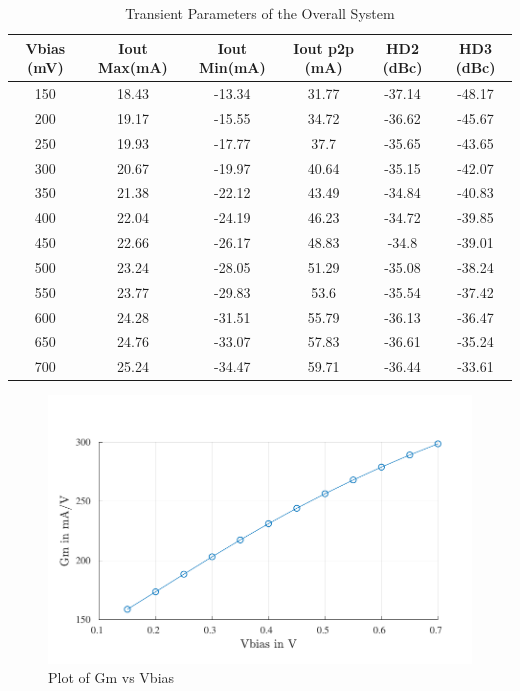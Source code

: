 \begin{table} [H]
\centering
\begin{tabular}{@{}cccccc@{}}
\toprule
Vbias (mV)		& Iout Max(mA)		& Iout Min(mA)	 & Iout p2p (mA) & HD2 (dBc)	&HD3 (dBc) \\ \midrule
150				& 18.43	 			& -13.34		 & 31.77		& -37.14		& -48.17	\\
200				& 19.17 			& -15.55		 & 34.72		& -36.62		& -45.67	\\
250				& 19.93 			& -17.77		 & 37.7			& -35.65		& -43.65	\\
300				& 20.67 			& -19.97		 & 40.64		& -35.15		& -42.07	\\
350				& 21.38				& -22.12		 & 43.49		& -34.84		& -40.83	\\
400				& 22.04				& -24.19		 & 46.23		& -34.72		& -39.85	\\
450				& 22.66 			& -26.17		 & 48.83		& -34.8			& -39.01	\\
500				& 23.24				& -28.05		 & 51.29		& -35.08		& -38.24	\\
550				& 23.77	 			& -29.83		 & 53.6			& -35.54		& -37.42	\\
600				& 24.28 			& -31.51		 & 55.79		& -36.13		& -36.47	\\
650				& 24.76 			& -33.07		 & 57.83		& -36.61		& -35.24	\\
700 			& 25.24 			& -34.47		 & 59.71		& -36.44		& -33.61	\\
\bottomrule
\end{tabular}
\caption{Transient Parameters of the Overall System}
\end{table}

\begin{figure} [H]
\centering
\includegraphics[scale=1]{Figures/Plots/Ov_Gm.pdf}
\caption{Plot of Gm vs Vbias}
\end{figure}

